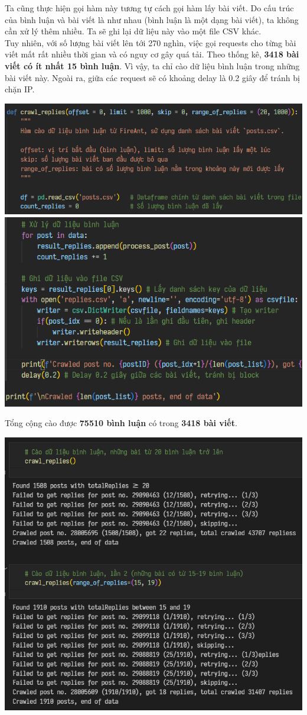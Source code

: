 Ta cũng thực hiện gọi hàm này tương tự cách gọi hàm lấy bài viết. Do cấu trúc của bình luận và bài viết là như nhau (bình luận là một dạng bài viết), ta không cần xử lý thêm nhiều. Ta sẽ ghi lại dữ liệu này vào một file CSV khác.\\

Tuy nhiên, với số lượng bài viết lên tới 270 nghìn, việc gọi requests cho từng bài viết mất rất nhiều thời gian và có nguy cơ gây quá tải. Theo thống kê, \textbf{3418 bài viết có ít nhất 15 bình luận}. Vì vậy, ta chỉ cào dữ liệu bình luận trong những bài viết này. Ngoài ra, giữa các request sẽ có khoảng delay là 0.2 giây để tránh bị chặn IP.

\begin{center}
    \centering
    \includegraphics[width=0.7\linewidth]{images/code-1.8-crawlrep1.png}
    \includegraphics[width=0.7\linewidth]{images/code-1.9-crawlrep2.png}
\end{center}

Tổng cộng cào được \textbf{75510 bình luận} có trong \textbf{3418 bài viết}.
\begin{center}
    \includegraphics[width=0.8\linewidth]{images/code-1.10-crawlrepresult.png}
\end{center}

